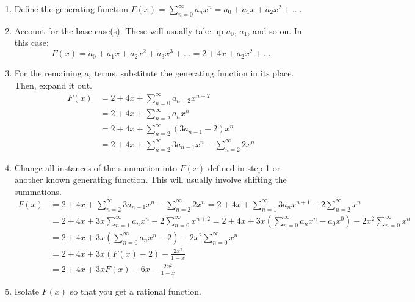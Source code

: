 \documentclass[letterpaper]{article}
\begin{document}
\begin{enumerate}[(1)]
    \item Define the generating function $F(x) = \sum_{n = 0}^{\infty} a_n x^n = a_0 + a_1 x + a_2 x^2 + \dots$. 
    \item Account for the base case(s). These will usually take up $a_0$, $a_1$, and so on. In this case:
    \[F(x) = \boxed{a_0 + a_1 x} + a_2 x^2 + a_3 x^3 + \dots = \boxed{2 + 4x} + a_2 x^2 + \dots\]
    \item For the remaining $a_i$ terms, substitute the generating function in its place. Then, expand it out. 
    \begin{equation*}
        \begin{aligned}
            F(x) &= 2 + 4x + \boxed{\sum_{n = 0}^{\infty} a_{n + 2} x^{n + 2}} \\ 
                &= 2 + 4x + \boxed{\sum_{n = 2}^{\infty} a_{n} x^{n}} \\ 
                &= 2 + 4x + \boxed{\sum_{n = 2}^{\infty} (3a_{n - 1} - 2) x^{n}} \\ 
                &= 2 + 4x + \boxed{\sum_{n = 2}^{\infty} 3a_{n - 1} x^n - \sum_{n = 2}^{\infty} 2x^n}
        \end{aligned}
    \end{equation*}
    \item Change all instances of the summation into $F(x)$ defined in step 1 or another known generating function. This will usually involve shifting the summations. 
    \begin{equation*}
        \begin{aligned}
            F(x) &= 2 + 4x + \sum_{n = 2}^{\infty} 3a_{n - 1} x^n - \sum_{n = 2}^{\infty} 2x^n = 2 + 4x + \sum_{n = 1}^{\infty} 3a_{n} x^{n + 1} - 2 \sum_{n = 2}^{\infty} x^n \\ 
                &= 2 + 4x + 3x \sum_{n = 1}^{\infty} a_{n} x^{n} - 2 \sum_{n = 0}^{\infty} x^{n + 2} = 2 + 4x + 3x \left(\sum_{n = 0}^{\infty} a_{n} x^{n} - a_0 x^0\right) - 2x^2 \sum_{n = 0}^{\infty} x^n \\ 
                &= 2 + 4x + 3x \left(\boxed{\sum_{n = 0}^{\infty} a_{n} x^{n}} - 2\right) - \boxed{2x^2 \sum_{n = 0}^{\infty} x^n}\\ 
                &= 2 + 4x + 3x \left(\boxed{F(x)} - 2\right) - \boxed{\frac{2x^2}{1 - x}} \\ 
                &= 2 + 4x + 3xF(x) - 6x - \frac{2x^2}{1 - x}
        \end{aligned}
    \end{equation*}
    \item Isolate $F(x)$ so that you get a rational function. 
    

\end{enumerate}
\end{document}
